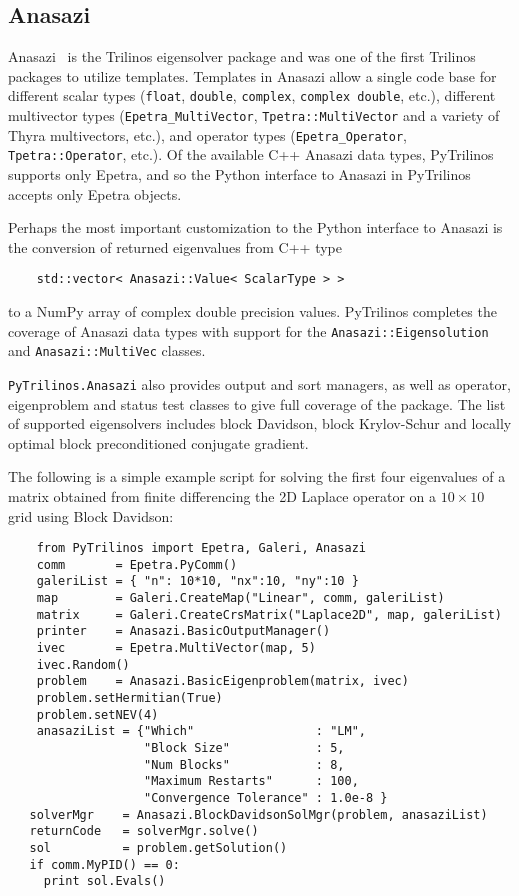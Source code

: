 \documentclass[11pt]{article}
\begin{document}
\subsection{Anasazi}
\label{sec:anasazi}

Anasazi~\cite{Anasazi} is the Trilinos eigensolver package and was one of the first Trilinos packages to utilize templates.  Templates in Anasazi allow a single code base for different scalar types ({\tt float}, {\tt double}, {\tt complex}, {\tt complex double}, etc.), different multivector types ({\tt Epetra\_MultiVector}, {\tt Tpetra::MultiVector} and a variety of Thyra multivectors, etc.), and operator types ({\tt Epetra\_Operator}, {\tt Tpetra::Operator}, etc.).  Of the available C++ Anasazi data types, PyTrilinos supports only Epetra, and so the Python interface to Anasazi in PyTrilinos accepts only Epetra objects.

Perhaps the most important customization to the Python interface to Anasazi is the conversion of returned eigenvalues from C++ type
\begin{verbatim}
    std::vector< Anasazi::Value< ScalarType > >
\end{verbatim}
to a NumPy array of complex double precision values.  PyTrilinos completes the coverage of Anasazi data types with support for the {\tt Anasazi::Eigensolution} and {\tt Anasazi::MultiVec} classes.

{\tt PyTrilinos.Anasazi} also provides output and sort managers, as well as operator, eigenproblem and status test classes to give full coverage of the package.  The list of supported eigensolvers includes block Davidson, block Krylov-Schur and locally optimal block preconditioned conjugate gradient.

The following is a simple example script for solving the first four eigenvalues of a matrix obtained from finite differencing the 2D Laplace operator on a $10\times10$ grid using Block Davidson:
\begin{verbatim}
    from PyTrilinos import Epetra, Galeri, Anasazi
    comm       = Epetra.PyComm()
    galeriList = { "n": 10*10, "nx":10, "ny":10 }
    map        = Galeri.CreateMap("Linear", comm, galeriList)
    matrix     = Galeri.CreateCrsMatrix("Laplace2D", map, galeriList)
    printer    = Anasazi.BasicOutputManager()
    ivec       = Epetra.MultiVector(map, 5)
    ivec.Random()
    problem    = Anasazi.BasicEigenproblem(matrix, ivec)
    problem.setHermitian(True)
    problem.setNEV(4)
    anasaziList = {"Which"                 : "LM",
                   "Block Size"            : 5,
                   "Num Blocks"            : 8,
                   "Maximum Restarts"      : 100,
                   "Convergence Tolerance" : 1.0e-8 }
   solverMgr    = Anasazi.BlockDavidsonSolMgr(problem, anasaziList)
   returnCode   = solverMgr.solve()
   sol          = problem.getSolution()
   if comm.MyPID() == 0:
     print sol.Evals()
\end{verbatim}
\end{document}
